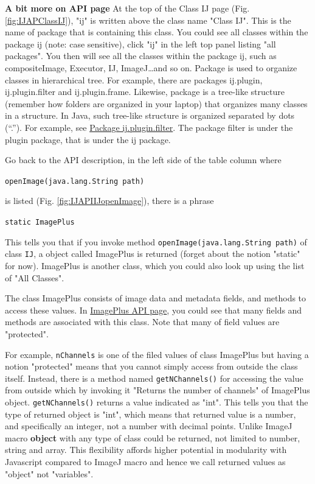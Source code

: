 \documentclass[11pt,a4paper,oneside]{report}
\newcommand{\ilcom}[1]{\texttt{\small#1}}
\begin{document}
 \textbf{A bit more on API page} At the top of the Class IJ page (Fig.\ref{fig:IJAPClassIJ}), 
 "ij" is written above the class name "Class IJ". 
 This is the name of package that is containing this class. 
 You could see all classes within the package ij (note: case sensitive), 
 click "ij" in the left top panel listing "all packages".  
 You then will see all the classes within the package ij, 
 such as compositeImage, Executor, IJ, ImageJ\dots and so on. 
 Package is used to organize classes in hierarchical tree. 
 For example, there are packages ij.plugin, ij.plugin.filter and ij.plugin.frame. 
 Likewise, package is a tree-like structure (remember how folders are organized in your laptop) 
 that organizes many classes in a structure. In Java, such tree-like structure
 is organized separated by dots (``.''). For example, see
 \href{http://rsb.info.nih.gov/ij/developer/api/ij/plugin/filter/package-summary.html}{Package
 ij.plugin.filter}. The package filter is under the plugin package, that is
 under the ij package. 
  
Go back to the API description, in the left side of the table column where 

\ilcom{openImage(java.lang.String path) } 

is listed (Fig. \ref{fig:IJAPIIJopenImage}), there is a phrase 

\ilcom{static ImagePlus} 

This tells you that if you invoke method \ilcom{openImage(java.lang.String path)} of class \ilcom{IJ}, 
a object called ImagePlus is returned (forget about the notion "static" for now). 
ImagePlus is another class, which you could also look up using the list of "All Classes".  

The class ImagePlus consists of image data and metadata fields, and methods to access these values. 
In \href{http://rsb.info.nih.gov/ij/developer/api/ij/ImagePlus.html}{ImagePlus API page}, 
you could see that many fields and methods are associated with this class. 
Note that many of field values are "protected". 

For example, \ilcom{nChannels} is one of the filed values of class ImagePlus 
but having a notion "protected" means that you cannot simply access from outside the class itself. 
Instead, there is a method named \ilcom{getNChannels()} for accessing the value 
from outside which by invoking it "Returns the number of channels" of ImagePlus object. 
\ilcom{getNChannels()} returns a value indicated as "int". 
This tells you that the type of returned object is "int", which means that returned value is a number, 
and specifically an integer, not a number with decimal points. Unlike ImageJ macro 
\textbf{object} with any type of class could be returned, not limited to number, string and array. 
This flexibility affords higher potential in modularity with Javascript compared to ImageJ macro 
and hence we call returned values as "object" not "variables". 
\end{document}
